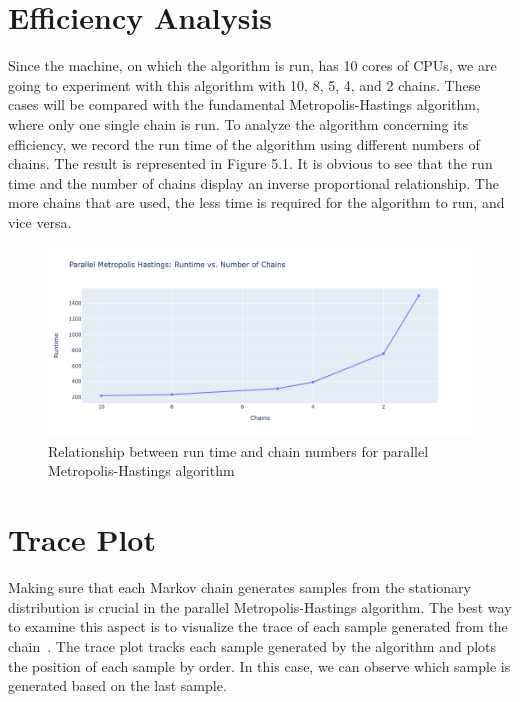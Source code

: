 \section{Efficiency Analysis}
Since the machine, on which the algorithm is run, has 10 cores of CPUs, we are going to experiment with this algorithm with 10, 8, 5, 4, and 2 chains. These cases will be compared with the fundamental Metropolis-Hastings algorithm, where only one single chain is run. To analyze the algorithm concerning its efficiency, we record the run time of the algorithm using different numbers of chains. The result is represented in Figure 5.1. It is obvious to see that the run time and the number of chains display an inverse proportional relationship. The more chains that are used, the less time is required for the algorithm to run, and vice versa.

\begin{figure}[H]
    \centering
    \includegraphics[width=1\textwidth]{figures/parallel_mh/runtime.png}
    \captionsetup{width=.8\textwidth}
    \caption{Relationship between run time and chain numbers for parallel Metropolis-Hastings algorithm}
    \label{fig:enter-label}
\end{figure}

\section{Trace Plot}
Making sure that each Markov chain generates samples from the stationary distribution is crucial in the parallel Metropolis-Hastings algorithm. The best way to examine this aspect is to visualize the trace of each sample generated from the chain~\cite{mcmc_practice}. The trace plot tracks each sample generated by the algorithm and plots the position of each sample by order. In this case, we can observe which sample is generated based on the last sample.

